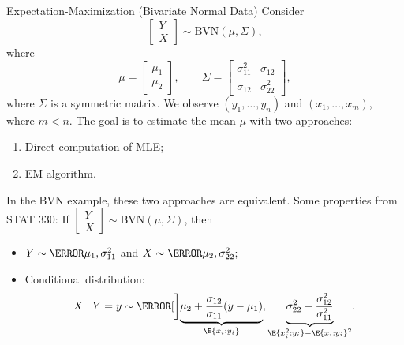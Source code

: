 \begin{Example}{Expectation-Maximization (Bivariate Normal Data)}
    Consider
    \[ \begin{bmatrix}
            Y \\
            X
        \end{bmatrix}
        \sim \text{BVN}(\mu,\Sigma), \]
    where
    \[ \mu=\begin{bmatrix}
            \mu_1 \\
            \mu_2
        \end{bmatrix},\qquad
        \Sigma=\begin{bmatrix}
            \sigma_{11}^2 & \sigma_{12}   \\
            \sigma_{12}   & \sigma_{22}^2
        \end{bmatrix}, \]
    where $ \Sigma $ is a symmetric matrix. We observe
    $ (y_1,\ldots,y_n) $ and $ (x_1,\ldots,x_m) $,
    where $ m<n $. The goal is to estimate the mean $ \mu $
    with two approaches:
    \begin{enumerate}[(1)]
        \item Direct computation of MLE\@;
        \item EM algorithm.
    \end{enumerate}
    In the BVN example, these two approaches are equivalent.
    Some properties from STAT 330: If $ \begin{bmatrix}
            Y \\
            X
        \end{bmatrix}\sim \text{BVN}(\mu,\Sigma) $, then
    \begin{itemize}
        \item $ Y \sim \N{\mu_1,\sigma_{11}^2} $ and $ X \sim \N{\mu_2,\sigma_{22}^2} $;
        \item Conditional distribution:
              \[ X\mid Y=y \sim \N[\bigg]{
                      \underbrace{\mu_2+
                          \frac{\sigma_{12}}{\sigma_{11}}(y-\mu_1)}_{\E{x_i\given y_i}},
                      \underbrace{\sigma_{22}^2-\frac{\sigma_{12}^2}{\sigma_{11}^2}}_{\E{x_i^2\given y_i}-\E{x_i\given y_i}^2}}. \]

    \end{itemize}
\end{Example}